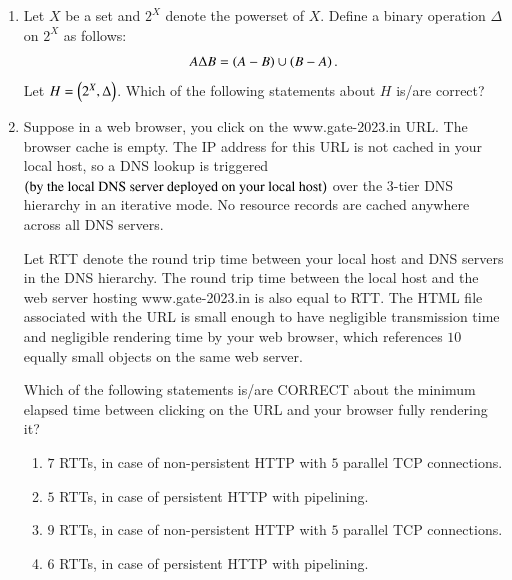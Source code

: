 \documentclass[journal,12pt,onecolumn]{IEEEtran}
\theoremstyle{remark}
\begin{document}
\begin{enumerate}
		\item Let $X$ be a set and $2^X$ denote the powerset of $X$.
		Define a binary operation $\Delta$ on $2^X$ as follows:
		$$A\Delta B = \left(A - B\right) \cup \left(B - A\right).$$
		Let $H = \left(2^X, \Delta\right)$. Which of the following statements about $H$ is/are correct?
		
		\hfill{}
		
		\begin{enumerate}
		\end{enumerate}
		
		\item Suppose in a web browser, you click on the www.gate-2023.in URL. The browser cache is empty. The IP address for this URL is not cached in your local host, so a DNS lookup is triggered $\left(\text{by the local DNS server deployed on your local host}\right)$ over the $3$-tier DNS hierarchy in an iterative mode. No resource records are cached anywhere across all DNS servers.
		
		Let RTT denote the round trip time between your local host and DNS servers in the DNS hierarchy. The round trip time between the local host and the web server hosting www.gate-2023.in is also equal to RTT. The HTML file associated with the URL is small enough to have negligible transmission time and negligible rendering time by your web browser, which references $10$ equally small objects on the same web server.
		
		Which of the following statements is/are CORRECT about the minimum elapsed time between clicking on the URL and your browser fully rendering it?
		
		\hfill{\brak{\text{GATE CS 2023}}}
		
		\begin{enumerate}
				\item $7$ RTTs, in case of non-persistent HTTP with $5$ parallel TCP connections.
				\item $5$ RTTs, in case of persistent HTTP with pipelining.
				\item $9$ RTTs, in case of non-persistent HTTP with $5$ parallel TCP connections.
				\item $6$ RTTs, in case of persistent HTTP with pipelining.
		\end{enumerate}
		

\end{enumerate}
\end{document}
